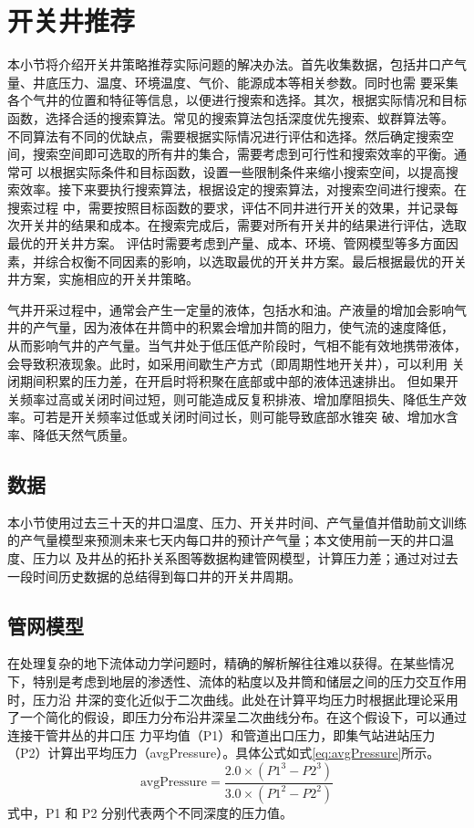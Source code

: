\section{开关井推荐}
本小节将介绍开关井策略推荐实际问题的解决办法。首先收集数据，包括井口产气量、井底压力、温度、环境温度、气价、能源成本等相关参数。同时也需
要采集各个气井的位置和特征等信息，以便进行搜索和选择。其次，根据实际情况和目标函数，选择合适的搜索算法。常见的搜索算法包括深度优先搜索、蚁群算法等。
不同算法有不同的优缺点，需要根据实际情况进行评估和选择。然后确定搜索空间，搜索空间即可选取的所有井的集合，需要考虑到可行性和搜索效率的平衡。通常可
以根据实际条件和目标函数，设置一些限制条件来缩小搜索空间，以提高搜索效率。接下来要执行搜索算法，根据设定的搜索算法，对搜索空间进行搜索。在搜索过程
中，需要按照目标函数的要求，评估不同井进行开关的效果，并记录每次开关井的结果和成本。在搜索完成后，需要对所有开关井的结果进行评估，选取最优的开关井方案。
评估时需要考虑到产量、成本、环境、管网模型等多方面因素，并综合权衡不同因素的影响，以选取最优的开关井方案。最后根据最优的开关井方案，实施相应的开关井策略。

气井开采过程中，通常会产生一定量的液体，包括水和油。产液量的增加会影响气井的产气量，因为液体在井筒中的积累会增加井筒的阻力，使气流的速度降低，
从而影响气井的产气量。当气井处于低压低产阶段时，气相不能有效地携带液体，会导致积液现象。此时，如采用间歇生产方式（即周期性地开关井），可以利用
关闭期间积累的压力差，在开启时将积聚在底部或中部的液体迅速排出。
但如果开关频率过高或关闭时间过短，则可能造成反复积排液、增加摩阻损失、降低生产效率。可若是开关频率过低或关闭时间过长，则可能导致底部水锥突
破、增加水含率、降低天然气质量。
\subsection{数据}
本小节使用过去三十天的井口温度、压力、开关井时间、产气量值并借助前文训练的产气量模型来预测未来七天内每口井的预计产气量；本文使用前一天的井口温度、压力以
及井丛的拓扑关系图等数据构建管网模型，计算压力差；通过对过去一段时间历史数据的总结得到每口井的开关井周期。
\subsection{管网模型}
在处理复杂的地下流体动力学问题时，精确的解析解往往难以获得。在某些情况下，特别是考虑到地层的渗透性、流体的粘度以及井筒和储层之间的压力交互作用时，压力沿
井深的变化近似于二次曲线。此处在计算平均压力时根据此理论采用了一个简化的假设，即压力分布沿井深呈二次曲线分布。在这个假设下，可以通过连接干管井丛的井口压
力平均值（P1）和管道出口压力，即集气站进站压力（P2）计算出平均压力（avgPressure）。具体公式如式\eqref{eq:avgPressure}所示。
\begin{equation}
    \text{avgPressure} = \frac{2.0 \times (P1^3 - P2^3)}{3.0 \times (P1^2 - P2^2)}
    \label{eq:avgPressure}
\end{equation}
式中，P1 和 P2 分别代表两个不同深度的压力值。

